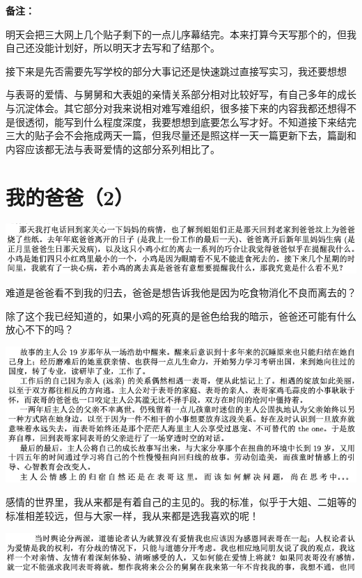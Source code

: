 \documentclass[9pt, b5paper]{article}
\begin{document}
\textbf{备注：}

明天会把三大网上几个贴子剩下的一点儿序幕结完。本来打算今天写那个的，但我自己还没能计划好，所以明天才去写和了结那个。 

接下来是先否需要先写学校的部分大事记还是快速跳过直接写实习，我还要想想

与表哥的爱情、与舅舅和大表姐的亲情关系部分相对比较好写，有自己多年的成长与沉淀体会。其它部分对我来说相对难写难组织，很多接下来的内容我都还想得不是很透彻，能写到什么程度深度，我要想想到底要怎么写才好。不知道接下来结完三大的贴子会不会拖成两天一篇，但我尽量还是照这样一天一篇更新下去，篇副和内容应该都无法与表哥爱情的这部分系列相比了。

\section{我的爸爸（2）}
\label{sec:org17fd451}

\begin{center}
\includegraphics[width=.9\linewidth]{./pic/backups_plans_20210415_093929.png}
\end{center}

难道是爸爸看不到我的归去，爸爸是想告诉我他是因为吃食物消化不良而离去的？

除了这个我已经知道的，如果小鸡的死真的是爸色给我的暗示，爸爸还可能有什么放心不下的吗？

\begin{center}
\includegraphics[width=.9\linewidth]{./pic/backups_plans_20210415_091659.png}
\end{center}

感情的世界里，我从来都是有着自己的主见的。我的标准，似乎于大姐、二姐等的标准相差较远，但与大家一样，我从来都是选我喜欢的呢！

\begin{center}
\includegraphics[width=.9\linewidth]{./pic/backups_plans_20210415_095344.png}
\end{center}
\end{document}
